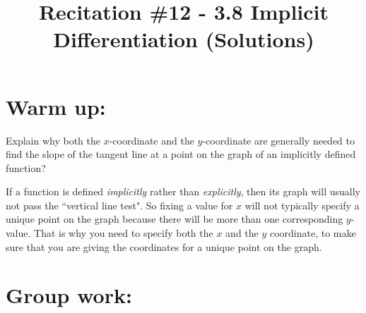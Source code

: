 \documentclass[nooutcomes]{ximera}
\title{Recitation \#12 - 3.8 Implicit Differentiation (Solutions)}
\begin{document}
\begin{abstract}		\end{abstract}
\maketitle

\section*{Warm up:} 
Explain why both the $x$-coordinate and the $y$-coordinate are generally needed to find the slope of the tangent line at a point on the graph of an implicitly defined function?
	\begin{freeResponse}
	If a function is defined \emph{implicitly} rather than \emph{explicitly}, then its graph will usually not pass the ``vertical line test".  So fixing a value for $x$ will not typically specify a unique point on the graph because there will be more than one corresponding $y$-value.  That is why you need to specify both the $x$ and the $y$ coordinate, to make sure that you are giving the coordinates for a unique point on the graph.
	\end{freeResponse}	
	
	
	
	
	

\section*{Group work:}
\end{document}
